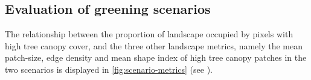 \documentclass[10pt,letterpaper]{article}
\begin{document}



\subsection*{Evaluation of greening scenarios}

The relationship between the proportion of landscape occupied by pixels with high tree canopy cover, and the three other landscape metrics, namely the mean patch-size, edge density and mean shape index of high tree canopy patches in the two scenarios is displayed in \autoref{fig:scenario-metrics} (see ).
\end{document}
